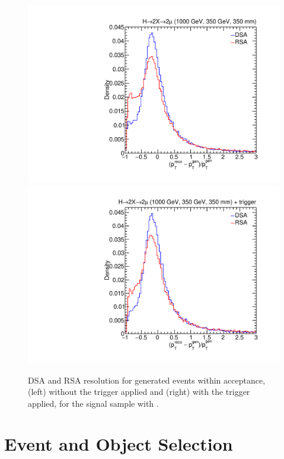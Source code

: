 \begin{figure}[htpb]
  \centering
  \includegraphics[width=\DSquareWidth]{figures/displaced/PTRES_2Mu2J_1000_350_350.pdf}
  \hspace*{-2em}
  \includegraphics[width=\DSquareWidth]{figures/displaced/PTRES_Trig_2Mu2J_1000_350_350.pdf}
  \caption{DSA and RSA \pT resolution for generated events within acceptance, (left) without the trigger applied and (right) with the trigger applied, for the \twoMu signal sample with .}
  \label{fig:dd:PTRES_DSA_RSA}
\end{figure}

\section{Event and Object Selection}
